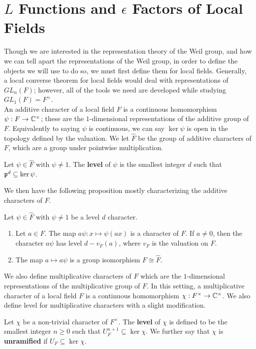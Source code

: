 \section{$L$ Functions and $\epsilon$ Factors of Local Fields}
\label{sec:Leps-LF}
Though we are interested in the representation theory of the Weil group, and how we can tell apart the representations of the Weil group, in order to define the objects we will use to do so, we must first define them for local fields.
Generally, a local converse theorem for local fields would deal with representations of $GL_n(F)$; however, all of the tools we need are developed while studying $GL_1(F) = F^\times$.\\

An additive character of a local field $F$ is a continuous homomorphism $\psi: F \to \mathbb{C}^\times$; these are the $1$-dimensional representations of the additive group of $F$.
Equivalently to saying $\psi$ is continuous, we can say $\ker \psi$ is open in the topology defined by the valuation.
We let $\hat{F}$ be the group of additive characters of $F$, which are a group under pointwise multiplication.
\begin{defn}
  Let $\psi \in \hat{F}$ with $\psi \neq 1$.
  The \textbf{level} of $\psi$ is the smallest integer $d$ such that $\mathfrak{p}^d \subseteq \ker \psi$.
\end{defn}
We then have the following proposition mostly characterizing the additive characters of $F$.
\begin{prop}
  Let $\psi \in \hat{F}$ with $\psi \neq 1$ be a level $d$ character.
  \begin{enumerate}
    \item Let $a \in F$. The map $a \psi : x \mapsto \psi(ax)$ is a character of $F$. If $a \neq 0$, then the character $a \psi$ has level $d - v_F(a)$, where $v_F$ is the valuation on $F$.
    \item The map $a \mapsto a \psi$ is a group isomorphism $F \cong \hat{F}$.
  \end{enumerate}
\end{prop}

We also define multiplicative characters of $F$ which are the $1$-dimensional representations of the multiplicative group of $F$.
In this setting, a multiplicative character of a local field $F$ is a continuous homomorphism $\chi : F^\times \to \mathbb{C}^\times$.
We also define level for multiplicative characters with a slight modification.
\begin{defn}
  Let $\chi$ be a non-trivial character of $F^\times$.
  The \textbf{level} of $\chi$ is defined to be the smallest integer $n \geq 0$ such that $U^{n+1}_F \subseteq \ker \chi$.
  We further say that $\chi$ is \textbf{unramified} if $U_F \subseteq \ker \chi$.
\end{defn}

